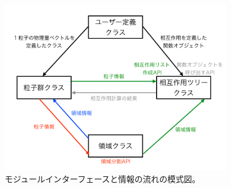 
\begin{figure}[h]
  \begin{center}
    \includegraphics[width=10cm,bb=0 0 700 700]{fig/illustration/illustration.001.jpg}
  \end{center}
  \caption{モジュールインターフェースと情報の流れの模式図。}
  \label{fig:brief_interface}
\end{figure}

